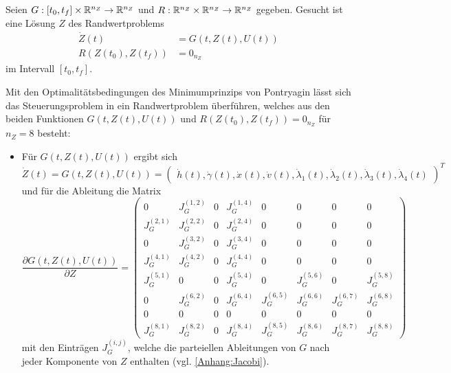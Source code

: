\begin{problem}\label{prob:ZweiRand}
    Seien $G : [t_0,t_f] \times \mathbb{R}^{n_Z} \to \mathbb{R}^{n_Z}$ und $R : \mathbb{R}^{n_Z} \times \mathbb{R}^{n_Z} \to \mathbb{R}^{n_Z}$ gegeben. Gesucht ist eine Lösung $Z$ des Randwertproblems
    \begin{align}
        \dot{Z}(t) &= G(t,Z(t),U(t)) \\
        R(Z(t_0),Z(t_f)) &= 0_{n_Z}
    \end{align}
    im Intervall $[t_0,t_f]$.
\end{problem}

Mit den Optimalitätsbedingungen des Minimumprinzips von Pontryagin lässt sich das Steuerungsproblem in ein Randwertproblem überführen, welches aus den beiden Funktionen $G(t,Z(t),U(t))$ und $R(Z(t_0),Z(t_f)) = 0_{n_Z}$ für $n_Z = 8$ besteht:
\begin{itemize}
\item Für $G(t,Z(t),U(t))$ ergibt sich
\begin{equation} 
    \dot{Z}(t) = G(t,Z(t),U(t)) = 
    \begin{pmatrix}
        \dot{h}(t),\dot{\gamma}(t),\dot{x}(t),\dot{v}(t),\dot{\lambda}_1(t),\dot{\lambda}_2(t),\dot{\lambda}_3(t),\dot{\lambda}_4(t)
    \end{pmatrix}^T
\end{equation}
und für die Ableitung die Matrix
\begin{equation}
    \dfrac{\partial G(t,Z(t),U(t))}{\partial Z} = 
    \begin{pmatrix}
        0 & J_G^{(1,2)} & 0 & J_G^{(1,4)} & 0 & 0 & 0 & 0 \\ 
        J_G^{(2,1)} & J_G^{(2,2)} & 0 & J_G^{(2,4)} & 0 & 0 & 0 & 0 \\ 
        0 & J_G^{(3,2)} & 0 & J_G^{(3,4)} & 0 & 0 & 0 & 0 \\ 
        J_G^{(4,1)} & J_G^{(4,2)} & 0 & J_G^{(4,4)} & 0 & 0 & 0 & 0 \\
        J_G^{(5,1)} & 0 & 0 & J_G^{(5,4)} & 0 & J_G^{(5,6)} & 0 & J_G^{(5,8)} \\
        0 & J_G^{(6,2)} & 0 & J_G^{(6,4)} & J_G^{(6,5)} & J_G^{(6,6)} & J_G^{(6,7)} & J_G^{(6,8)} \\
        0 & 0 & 0 & 0 & 0 & 0 & 0 & 0 \\
        J_G^{(8,1)} & J_G^{(8,2)} & 0 & J_G^{(8,4)} & J_G^{(8,5)} & J_G^{(8,6)} & J_G^{(8,7)} & J_G^{(8,8)}
    \end{pmatrix}
\end{equation}
mit den Einträgen \(J_G^{(i,j)}\), welche die parteiellen Ableitungen von \(G\) nach jeder Komponente von \(Z\) enthalten (vgl. \autoref{Anhang:Jacobi}).

\end{itemize}
